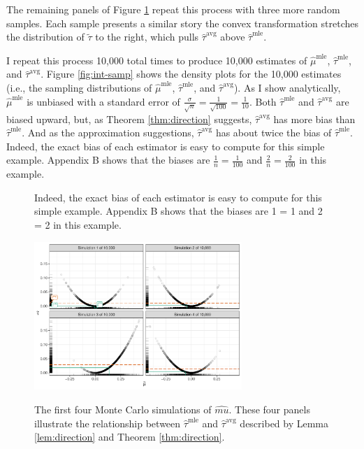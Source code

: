 \documentclass[12pt]{article}
\begin{document}
The remaining panels of Figure \ref{fig:samp} repeat this process with three more random samples.
Each sample presents a similar story \textemdash{} the convex transformation stretches the distribution of $\tilde{\tau}$ to the right, which pulls $\hat{\tau}^\text{avg}$ above $\hat{\tau}^\text{mle}$.

I repeat this process 10,000 total times to produce 10,000 estimates of $\hat{\mu}^\text{mle}$, $\hat{\tau}^\text{mle}$, and $\hat{\tau}^\text{avg}$.
Figure \ref{fig:int-samp} shows the density plots for the 10,000 estimates (i.e., the sampling distributions of $\hat{\mu}^\text{mle}$, $\hat{\tau}^\text{mle}$, and $\hat{\tau}^\text{avg}$).
As I show analytically, $\hat{\mu}^\text{mle}$ is unbiased with a standard error of $\frac{\sigma}{\sqrt{n}} = \frac{1}{\sqrt{100}} = \frac{1}{10}$.
Both $\hat{\tau}^\text{mle}$ and $\hat{\tau}^\text{avg}$ are biased upward, but, as Theorem \ref{thm:direction} suggests, $\hat{\tau}^\text{avg}$ has more bias than $\hat{\tau}^\text{mle}$. And as the approximation suggestions, $\hat{\tau}^\text{avg}$ has about twice the bias of $\hat{\tau}^\text{mle}$. Indeed, the exact bias of each estimator is easy to compute for this simple example. Appendix B shows that the biases are $\frac{1}{n} = \frac{1}{100}$ and $\frac{2}{n} = \frac{2}{100}$ in this example.

\begin{figure}[!h]Indeed, the exact bias of each estimator is easy to compute for this simple example.
Appendix B shows that the biases are 1 = 1 and 2 = 2 in this example.
\begin{center}
\includegraphics[width = 0.7\textwidth]{figs/intuition.pdf}\\
\vspace{.03in}
\caption{The first four Monte Carlo simulations of $\hat{mu}$. These four panels illustrate the relationship between $\hat{\tau}^\text{mle}$ and $\hat{\tau}^\text{avg}$ described by Lemma \ref{lem:direction} and Theorem \ref{thm:direction}.}\label{fig:samp}
\end{center}
\end{figure}
\end{document}
